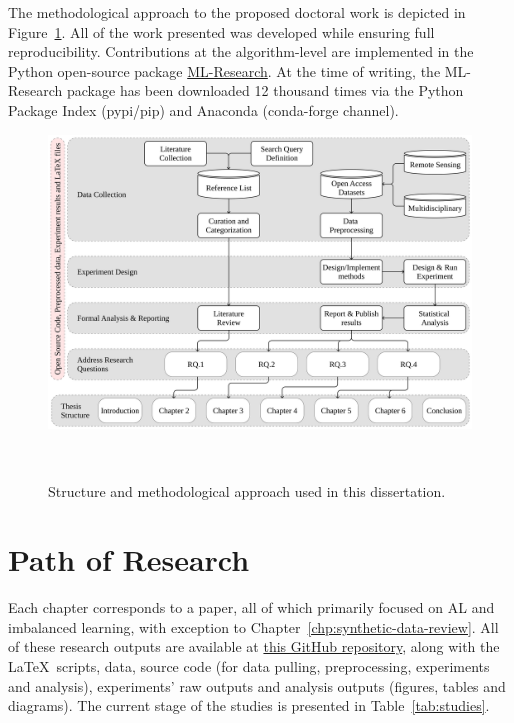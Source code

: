 The methodological approach to the proposed doctoral work is depicted in
Figure~\ref{fig:phd_structure}. All of the work presented was developed while
ensuring full reproducibility. Contributions at the algorithm-level are
implemented in the Python open-source package 
\href{https://github.com/joaopfonseca/ml-research}{ML-Research}. At the time
of writing, the ML-Research package has been downloaded 12 thousand times via
the Python Package Index (pypi/pip) and Anaconda (conda-forge channel).

\begin{figure}[ht]
	\centering
    \includegraphics[width=\linewidth]{phd_structure}
    \caption{Structure and methodological approach used in this dissertation.
    }~\label{fig:phd_structure}
\end{figure}


\section{Path of Research}

Each chapter corresponds to a paper, all of which primarily focused on AL and
imbalanced learning, with exception to
Chapter~\ref{chp:synthetic-data-review}. All of these research outputs are
available at \href{https://github.com/joaopfonseca/publications}{this GitHub
repository}, along with the \LaTeX\ scripts, data, source code (for data
pulling, preprocessing, experiments and analysis), experiments' raw outputs
and analysis outputs (figures, tables and diagrams). The current stage of 
the studies is presented in Table~\ref{tab:studies}.

